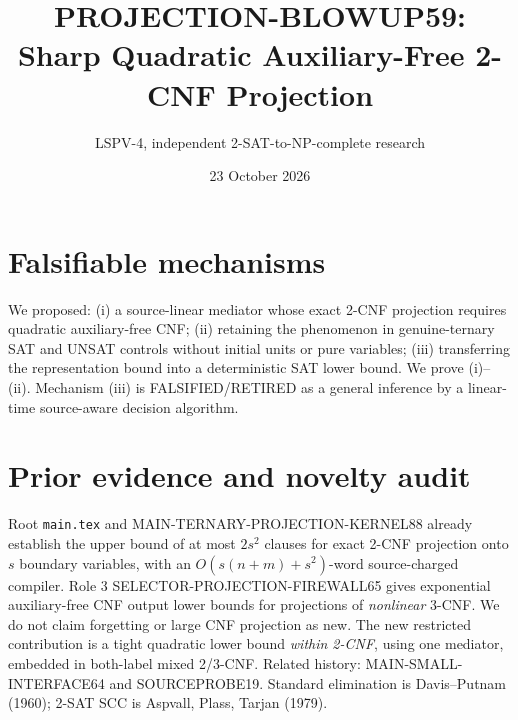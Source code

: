 \documentclass[11pt]{article}
\title{PROJECTION-BLOWUP59: Sharp Quadratic Auxiliary-Free 2-CNF Projection}
\author{LSPV-4, independent 2-SAT-to-NP-complete research}
\date{23 October 2026}
\begin{document}
\maketitle
\begin{center}\end{center}

\section{Falsifiable mechanisms}
We proposed: (i) a source-linear mediator whose exact 2-CNF projection requires quadratic auxiliary-free CNF; (ii) retaining the phenomenon in genuine-ternary SAT and UNSAT controls without initial units or pure variables; (iii) transferring the representation bound into a deterministic SAT lower bound. We prove (i)--(ii). Mechanism (iii) is FALSIFIED/RETIRED as a general inference by a linear-time source-aware decision algorithm.

\section{Prior evidence and novelty audit}
Root \texttt{main.tex} and MAIN-TERNARY-PROJECTION-KERNEL88 already establish the upper bound of at most $2s^2$ clauses for exact 2-CNF projection onto $s$ boundary variables, with an $O(s(n+m)+s^2)$-word source-charged compiler. Role 3 SELECTOR-PROJECTION-FIREWALL65 gives exponential auxiliary-free CNF output lower bounds for projections of \emph{nonlinear} 3-CNF. We do not claim forgetting or large CNF projection as new. The new restricted contribution is a tight quadratic lower bound \emph{within 2-CNF}, using one mediator, embedded in both-label mixed 2/3-CNF. Related history: MAIN-SMALL-INTERFACE64 and SOURCEPROBE19. Standard elimination is Davis--Putnam (1960); 2-SAT SCC is Aspvall, Plass, Tarjan (1979).
\end{document}
